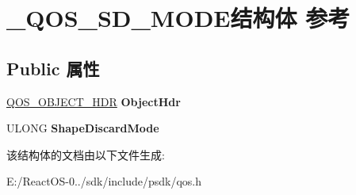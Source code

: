 \hypertarget{struct___q_o_s___s_d___m_o_d_e}{}\section{\+\_\+\+Q\+O\+S\+\_\+\+S\+D\+\_\+\+M\+O\+D\+E结构体 参考}
\label{struct___q_o_s___s_d___m_o_d_e}
\subsection*{Public 属性}
\begin{DoxyCompactItemize}
\item 
\mbox{\label{struct___q_o_s___s_d___m_o_d_e_a637fdae4ac2dec3b0f0eb33aab552241}} 
\hyperlink{struct___q_o_s___o_b_j_e_c_t___h_d_r}{Q\+O\+S\+\_\+\+O\+B\+J\+E\+C\+T\+\_\+\+H\+DR} {\bfseries Object\+Hdr}
\item 
\mbox{\label{struct___q_o_s___s_d___m_o_d_e_afda7491bb9b2271aa2202fc5dd004b1c}} 
U\+L\+O\+NG {\bfseries Shape\+Discard\+Mode}
\end{DoxyCompactItemize}


该结构体的文档由以下文件生成\+:\begin{DoxyCompactItemize}
\item 
E\+:/\+React\+O\+S-\/0../sdk/include/psdk/qos.\+h\end{DoxyCompactItemize}
